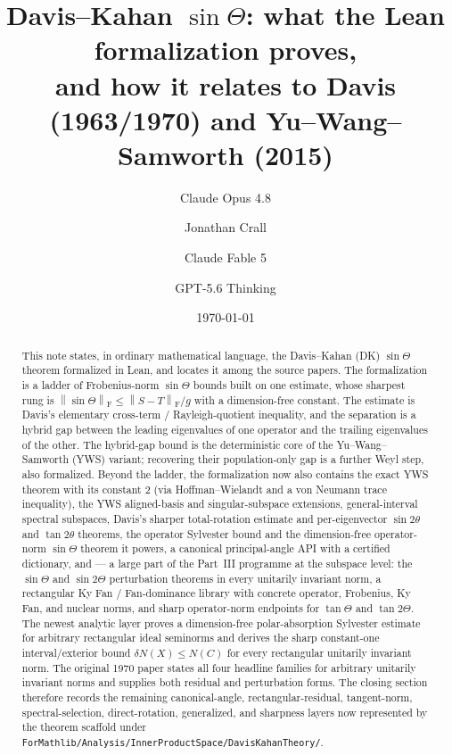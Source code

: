 \documentclass[11pt]{article}
\title{Davis--Kahan $\sin\Theta$: what the Lean formalization proves,\\
and how it relates to Davis (1963/1970) and Yu--Wang--Samworth (2015)}
\author{Claude Opus 4.8 \and Jonathan Crall \and Claude Fable 5 \and GPT-5.6 Thinking}
\date{\today}
\newcommand{\norm}[1]{\left\lVert #1\right\rVert}
\newcommand{\F}{\mathrm{F}}
\newcommand{\gap}{g}
\newcommand{\sinT}{\sin\Theta}
\theoremstyle{remark}
\begin{document}
\maketitle

\begin{abstract}
This note states, in ordinary mathematical language, the Davis--Kahan (DK)
$\sin\Theta$ theorem formalized in Lean, and locates it among the source papers.
The formalization is a ladder of Frobenius-norm $\sin\Theta$ bounds built on one
estimate, whose sharpest rung is $\norm{\sinT}_{\F}\le\norm{S-T}_{\F}/\gap$ with a
dimension-free constant.  The estimate is Davis's elementary cross-term /
Rayleigh-quotient inequality, and the separation is a hybrid gap between the
leading eigenvalues of one operator and the trailing eigenvalues of the other.
The hybrid-gap bound is the deterministic core of the Yu--Wang--Samworth (YWS)
variant; recovering their population-only gap is a further Weyl step, also
formalized.  Beyond the ladder, the formalization now also contains the exact
YWS theorem with its constant $2$ (via Hoffman--Wielandt and a von Neumann
trace inequality), the YWS aligned-basis and singular-subspace extensions,
general-interval spectral subspaces, Davis's sharper total-rotation estimate
and per-eigenvector $\sin2\theta$ and $\tan2\theta$ theorems, the operator
Sylvester bound and the dimension-free operator-norm $\sin\Theta$ theorem it
powers, a canonical principal-angle API with a certified dictionary, and ---
a large part of the Part~III programme at the subspace level: the
$\sin\Theta$ and $\sin2\Theta$ perturbation theorems in every unitarily
invariant norm, a rectangular Ky Fan / Fan-dominance library with concrete
operator, Frobenius, Ky Fan, and nuclear norms, and sharp operator-norm
endpoints for $\tan\Theta$ and $\tan2\Theta$.  The newest analytic layer proves
a dimension-free polar-absorption Sylvester estimate for arbitrary rectangular
ideal seminorms and derives the sharp constant-one interval/exterior bound
$\delta N(X)\le N(C)$ for every rectangular unitarily invariant norm.  The
original 1970 paper states all four headline families for arbitrary unitarily
invariant norms and supplies both residual and perturbation forms.  The closing section therefore records
the remaining canonical-angle, rectangular-residual, tangent-norm,
spectral-selection, direct-rotation, generalized, and sharpness layers now
represented by the theorem scaffold under
\texttt{ForMathlib/Analysis/InnerProductSpace/DavisKahanTheory/}.
\end{abstract}
\end{document}
